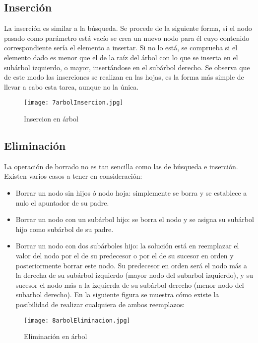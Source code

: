 \subsection{Inserción}
\label{sec:insercion}

La inserción es similar a la búsqueda. Se procede de la siguiente
forma, si el nodo pasado como parámetro está vacío se crea un nuevo
nodo para él cuyo contenido correspondiente sería el elemento a
insertar. Si no lo está, se comprueba si el elemento dado es menor que
el de la raíz del árbol con lo que se inserta en el subárbol
izquierdo, o mayor, insertándose en el subárbol derecho. Se observa
que de este modo las inserciones se realizan en las hojas, es la forma
más simple de llevar a cabo esta tarea, aunque no la única.
\begin{figure}[H]
  \centering
  \texttt{[image: 7arbolInsercion.jpg]}
  \caption{Insercion en árbol}
  \label{fig:7insercion}
\end{figure}

\subsection{Eliminación}
\label{sec:eliminacion}

La operación de borrado no es tan sencilla como las de búsqueda e
inserción. Existen varios casos a tener en consideración:
\begin{itemize}
\item Borrar un nodo sin hijos ó nodo hoja: simplemente se borra y se
  establece a nulo el apuntador de su padre.
\item Borrar un nodo con un subárbol hijo: se borra el nodo y se
  asigna su subárbol hijo como subárbol de su padre.
\item Borrar un nodo con dos subárboles hijo: la solución está en
  reemplazar el valor del nodo por el de su predecesor o por el de su
  sucesor en orden y posteriormente borrar este nodo. Su predecesor en
  orden será el nodo más a la derecha de su subárbol izquierdo (mayor
  nodo del subarbol izquierdo), y su sucesor el nodo más a la
  izquierda de su subárbol derecho (menor nodo del subarbol
  derecho). En la siguiente figura se muestra cómo existe la
  posibilidad de realizar cualquiera de ambos reemplazos:
\end{itemize}
\begin{figure}[H]
  \centering
  \texttt{[image: 8arbolEliminacion.jpg]}
  \caption{Eliminación en árbol}
  \label{fig:8arbolEliminacion}
\end{figure}

